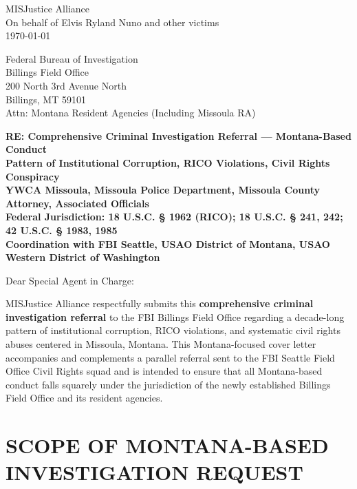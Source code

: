 \documentclass[12pt,oneside]{article}
\begin{document}
\begin{flushleft}

MISJustice Alliance \\
On behalf of Elvis Ryland Nuno and other victims \\
\today

\vspace{0.3in}

Federal Bureau of Investigation \\
Billings Field Office \\
200 North 3rd Avenue North \\
Billings, MT 59101 \\
Attn: Montana Resident Agencies (Including Missoula RA)

\vspace{0.3in}

\textbf{RE: Comprehensive Criminal Investigation Referral --- Montana-Based Conduct} \\
\textbf{Pattern of Institutional Corruption, RICO Violations, Civil Rights Conspiracy} \\
\textbf{YWCA Missoula, Missoula Police Department, Missoula County Attorney, Associated Officials} \\
\textbf{Federal Jurisdiction: 18 U.S.C. § 1962 (RICO); 18 U.S.C. § 241, 242; 42 U.S.C. § 1983, 1985} \\
\textbf{Coordination with FBI Seattle, USAO District of Montana, USAO Western District of Washington}

\vspace{0.3in}

Dear Special Agent in Charge:

\vspace{0.2in}

MISJustice Alliance respectfully submits this \textbf{comprehensive criminal investigation referral} to the FBI Billings Field Office regarding a decade-long pattern of institutional corruption, RICO violations, and systematic civil rights abuses centered in Missoula, Montana. This Montana-focused cover letter accompanies and complements a parallel referral sent to the FBI Seattle Field Office Civil Rights squad and is intended to ensure that all Montana-based conduct falls squarely under the jurisdiction of the newly established Billings Field Office and its resident agencies.

\section*{SCOPE OF MONTANA-BASED INVESTIGATION REQUEST}


\end{flushleft}
\end{document}
